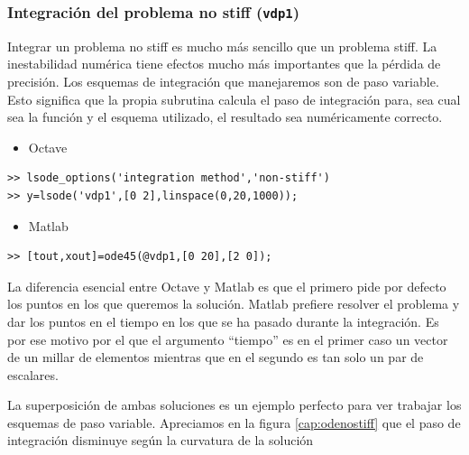 \subsubsection{Integración del problema no stiff (\texttt{vdp1})}

Integrar un problema no stiff es mucho más sencillo que un problema
stiff. La inestabilidad numérica tiene efectos mucho más importantes
que la pérdida de precisión. Los esquemas de integración que manejaremos
son de paso variable. Esto significa que la propia subrutina calcula
el paso de integración para, sea cual sea la función y el esquema
utilizado, el resultado sea numéricamente correcto.

\begin{itemize}
\item Octave
\end{itemize}
  \begin{verbatim}
>> lsode_options('integration method','non-stiff')
>> y=lsode('vdp1',[0 2],linspace(0,20,1000));
 \end{verbatim}
\begin{itemize}
\item Matlab
\end{itemize}
  \begin{verbatim}
>> [tout,xout]=ode45(@vdp1,[0 20],[2 0]); 
 \end{verbatim}
La diferencia esencial entre Octave y Matlab es que el primero pide
por defecto los puntos en los que queremos la solución. Matlab prefiere
resolver el problema y dar los puntos en el tiempo en los que se ha
pasado durante la integración. Es por ese motivo por el que el argumento
{}``tiempo'' es en el primer caso un vector de un millar de elementos
mientras que en el segundo es tan solo un par de escalares.

La superposición de ambas soluciones es un ejemplo perfecto para ver
trabajar los esquemas de paso variable. Apreciamos en la figura \ref{cap:odenostiff}
que el paso de integración disminuye según la curvatura de la solución

